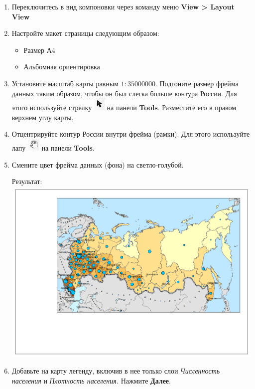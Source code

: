 \documentclass[]{book}
\providecommand{\tightlist}{%
  \setlength{\itemsep}{0pt}\setlength{\parskip}{0pt}}
\theoremstyle{definition}
\theoremstyle{definition}
\theoremstyle{definition}
\theoremstyle{remark}
\begin{document}
\begin{enumerate}
\def\labelenumi{\arabic{enumi}.}
\item
  Переключитесь в вид компоновки через команду меню \textbf{View
  \textgreater{} Layout View}
\item
  Настройте макет страницы следующим образом:

  \begin{itemize}
  \tightlist
  \item
    Размер А4
  \item
    Альбомная ориентировка
  \end{itemize}
\item
  Установите масштаб карты равным \(1:35 000 000\). Подгоните размер
  фрейма данных таким образом, чтобы он был слегка больше контура
  России. Для этого используйте стрелку
  \includegraphics{images/Ex02/image29.png} на панели \textbf{Tools}.
  Разместите его в правом верхнем углу карты.
\item
  Отцентрируйте контур России внутри фрейма (рамки). Для этого
  используйте лапу \includegraphics{images/Ex02/image30.png} на панели
  \textbf{Tools}.
\item
  Смените цвет фрейма данных (фона) на светло-голубой.

  Результат: \includegraphics{images/Ex02/image31.png}
\item
  Добавьте на карту легенду, включив в нее только слои \emph{Численность
  населения} и \emph{Плотность населения.} Нажмите \textbf{Далее}.


\end{enumerate}
\end{document}
